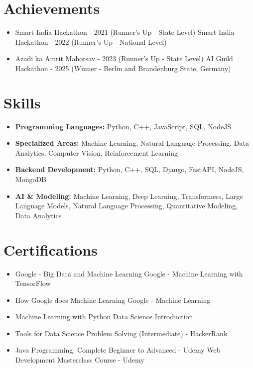 \documentclass[a4paper,10pt]{article}
\begin{document}
\section*{Achievements}
\begin{itemize}
\item Smart India Hackathon - 2021 (Runner's Up - State Level) \hfill Smart India Hackathon - 2022 (Runner's Up - National Level)
\item Azadi ka Amrit Mahotsav - 2023 (Runner's Up - State Level) \hfill AI Guild Hackathon - 2025 (Winner - Berlin and Brandenburg State, Germany)
\end{itemize}

\section*{Skills}
\begin{itemize}
  \item \textbf{Programming Languages:} Python, C++, JavaScript, SQL, NodeJS
  \item \textbf{Specialized Areas:} Machine Learning, Natural Language Processing, Data Analytics, Computer Vision, Reinforcement Learning
  \item \textbf{Backend Development:} Python, C++, SQL, Django, FastAPI, NodeJS, MongoDB
  \item \textbf{AI \& Modeling:} Machine Learning, Deep Learning, Transformers, Large Language Models, Natural Language Processing, Quantitative Modeling, Data Analytics
\end{itemize}

\section*{Certifications}
\begin{itemize}
\item Google - Big Data and Machine Learning \hfill Google - Machine Learning with TensorFlow
\item How Google does Machine Learning \hfill Google - Machine Learning
\item Machine Learning with Python \hfill Data Science Introduction
\item Tools for Data Science \hfill Problem Solving (Intermediate) - HackerRank
\item Java Programming: Complete Beginner to Advanced - Udemy \hfill Web Development Masterclass Course - Udemy
\end{itemize}
\end{document}
